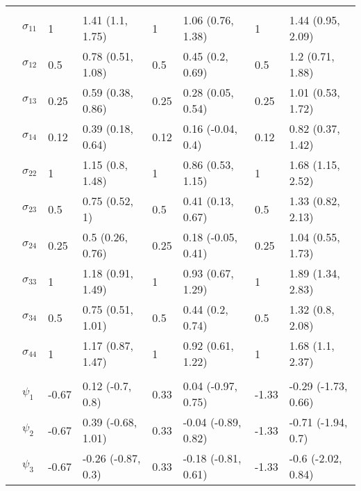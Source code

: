 \documentclass[]{article}
\begin{document}
\begin{table}[t]
\begin{tabular}{llllllll}
\addlinespace[0.3em]
\multicolumn{8}{l}{\textbf{ }}\\
\hspace{1em} & $\sigma_{11}$ & 1 & 1.41 (1.1, 1.75) & 1 & 1.06 (0.76, 1.38) & 1 & 1.44 (0.95, 2.09)\\
\hspace{1em} & $\sigma_{12}$ & 0.5 & 0.78 (0.51, 1.08) & 0.5 & 0.45 (0.2, 0.69) & 0.5 & 1.2 (0.71, 1.88)\\
\hspace{1em} & $\sigma_{13}$ & 0.25 & 0.59 (0.38, 0.86) & 0.25 & 0.28 (0.05, 0.54) & 0.25 & 1.01 (0.53, 1.72)\\
\hspace{1em} & $\sigma_{14}$ & 0.12 & 0.39 (0.18, 0.64) & 0.12 & 0.16 (-0.04, 0.4) & 0.12 & 0.82 (0.37, 1.42)\\
\hspace{1em} & $\sigma_{22}$ & 1 & 1.15 (0.8, 1.48) & 1 & 0.86 (0.53, 1.15) & 1 & 1.68 (1.15, 2.52)\\
\hspace{1em} & $\sigma_{23}$ & 0.5 & 0.75 (0.52, 1) & 0.5 & 0.41 (0.13, 0.67) & 0.5 & 1.33 (0.82, 2.13)\\
\hspace{1em} & $\sigma_{24}$ & 0.25 & 0.5 (0.26, 0.76) & 0.25 & 0.18 (-0.05, 0.41) & 0.25 & 1.04 (0.55, 1.73)\\
\hspace{1em} & $\sigma_{33}$ & 1 & 1.18 (0.91, 1.49) & 1 & 0.93 (0.67, 1.29) & 1 & 1.89 (1.34, 2.83)\\
\hspace{1em} & $\sigma_{34}$ & 0.5 & 0.75 (0.51, 1.01) & 0.5 & 0.44 (0.2, 0.74) & 0.5 & 1.32 (0.8, 2.08)\\
\hspace{1em} & $\sigma_{44}$ & 1 & 1.17 (0.87, 1.47) & 1 & 0.92 (0.61, 1.22) & 1 & 1.68 (1.1, 2.37)\\
\addlinespace[0.3em]
\multicolumn{8}{l}{\textbf{ }}\\
\hspace{1em} & $\psi_{1}$ & -0.67 & 0.12 (-0.7, 0.8) & 0.33 & 0.04 (-0.97, 0.75) & -1.33 & -0.29 (-1.73, 0.66)\\
\hspace{1em} & $\psi_{2}$ & -0.67 & 0.39 (-0.68, 1.01) & 0.33 & -0.04 (-0.89, 0.82) & -1.33 & -0.71 (-1.94, 0.7)\\
\hspace{1em} & $\psi_{3}$ & -0.67 & -0.26 (-0.87, 0.3) & 0.33 & -0.18 (-0.81, 0.61) & -1.33 & -0.6 (-2.02, 0.84)\\

\end{tabular}
\end{table}
\end{document}
